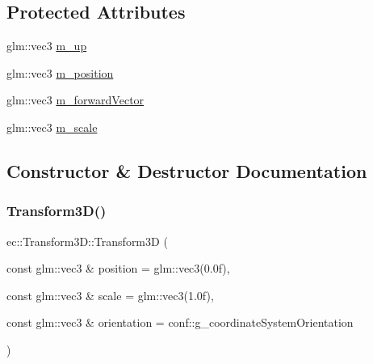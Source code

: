 \subsection*{Protected Attributes}
\begin{DoxyCompactItemize}
\item 
glm\+::vec3 \mbox{\hyperlink{classec_1_1_transform3_d_addd1132fb57befe841dfd9af94aa4329}{m\+\_\+up}}
\item 
glm\+::vec3 \mbox{\hyperlink{classec_1_1_transform3_d_a5bba8c29bb22d2b122b64b51b52335f7}{m\+\_\+position}}
\item 
glm\+::vec3 \mbox{\hyperlink{classec_1_1_transform3_d_a5d7ebb5dc842dc73fe0840f3e3f95ab8}{m\+\_\+forward\+Vector}}
\item 
glm\+::vec3 \mbox{\hyperlink{classec_1_1_transform3_d_a8eb8cecaa5ec8273e49c9487e0f6b935}{m\+\_\+scale}}
\end{DoxyCompactItemize}


\subsection{Constructor \& Destructor Documentation}
\mbox{\label{classec_1_1_transform3_d_adb5c661621922b1a3a6e6433ce1c79f6}} 
\subsubsection{\texorpdfstring{Transform3\+D()}{Transform3D()}}
{\footnotesize\ttfamily ec\+::\+Transform3\+D\+::\+Transform3D (\begin{DoxyParamCaption}\item[{const glm\+::vec3 \&}]{position = {\ttfamily glm\+:\+:vec3(0.0f)},  }\item[{const glm\+::vec3 \&}]{scale = {\ttfamily glm\+:\+:vec3(1.0f)},  }\item[{const glm\+::vec3 \&}]{orientation = {\ttfamily conf\+:\+:g\+\_\+coordinateSystemOrientation} }\end{DoxyParamCaption})\hspace{0.3cm}{\ttfamily [explicit]}}

\mbox{\label{classec_1_1_transform3_d_a1df4b7afcf78aef64719b2302cfac864}} 
